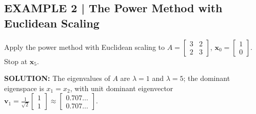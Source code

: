 \documentclass{article}
\begin{document}
\subsection*{EXAMPLE 2 | The Power Method with Euclidean Scaling}

Apply the power method with Euclidean scaling to
$A = \begin{bmatrix}3&2\\2&3\end{bmatrix}$, $\mathbf{x}_0=\begin{bmatrix}1\\0\end{bmatrix}$.
Stop at $\mathbf{x}_5$.

\textbf{SOLUTION:} The eigenvalues of $A$ are $\lambda=1$ and $\lambda=5$; the dominant
eigenspace is $x_1=x_2$, with unit dominant eigenvector
$\mathbf{v}_1 = \tfrac{1}{\sqrt{2}}\begin{bmatrix}1\\1\end{bmatrix}
\approx\begin{bmatrix}0.707\ldots\\0.707\ldots\end{bmatrix}$.
\end{document}
